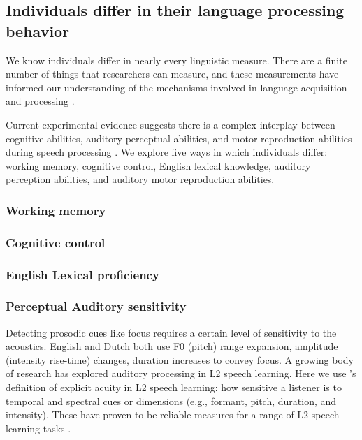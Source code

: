 \subsection{Individuals differ in their language processing behavior}
We know individuals differ in nearly every linguistic measure. There are a finite number of things that researchers can measure, and these measurements have informed our understanding of the mechanisms involved in language acquisition and processing \cite{Kidd2018, skehan1991individual, nelson1981individual}. 

Current experimental evidence suggests there is a complex interplay between cognitive abilities, auditory perceptual abilities, and motor reproduction abilities during speech processing \citep{saito2022does, bramlett_wiener_24_speechprosody, bakkouche2025effects, Kachlicka_Saito_Tierney_2019}. We explore five ways in which individuals differ: working memory, cognitive control, English lexical knowledge, auditory perception abilities, and auditory motor reproduction abilities.


\subsubsection{Working memory}

\subsubsection{Cognitive control}

\subsubsection{English Lexical proficiency}

\subsubsection{Perceptual Auditory sensitivity}
Detecting prosodic cues like focus requires a certain level of sensitivity to the acoustics. English and Dutch both use F0 (pitch) range expansion, amplitude (intensity rise-time) changes, duration increases to convey focus. A growing body of research has explored auditory processing in L2 speech learning. Here we use \cite{saito2023does}'s definition of explicit acuity in L2 speech learning: how sensitive a listener is to temporal and spectral cues or dimensions (e.g., formant,
pitch, duration, and intensity). These have proven to be reliable measures for a range of L2 speech learning tasks \citep{Kachlicka_Saito_Tierney_2019, bakkouche2025effects, bramlett_wiener_24_speechprosody}. 


